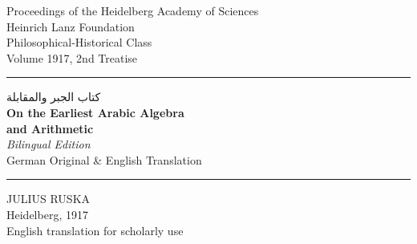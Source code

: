 \documentclass[10pt,a4paper]{article}
\newcommand{\RL}[1]{\beginR#1\endR}
\newcommand{\ar}[1]{{\arabicfont\RL{#1}}}
\begin{document}
\thispagestyle{empty}
\begin{center}
\vspace*{0.5cm}
{\footnotesize Proceedings of the Heidelberg Academy of Sciences\\
Heinrich Lanz Foundation\\
Philosophical-Historical Class\\[0.3em]
Volume 1917, 2nd Treatise}\vspace{1cm}

\rule{\textwidth}{1pt}\vspace{0.5cm}

{\ar{كتاب الجبر والمقابلة} \\[0.3em]
\textcolor{titlecolor}{\LARGE\bfseries On the Earliest Arabic Algebra\\[0.3em] and Arithmetic}\\[0.2em]
\textcolor{titlecolor}{\Large\itshape Bilingual Edition}\\[0.3em]
{\large German Original \& English Translation}}\vspace{0.5cm}

\rule{\textwidth}{1pt}\vspace{1cm}

{\Large JULIUS RUSKA}\\[0.3cm]
{\normalsize Heidelberg, 1917}\\[0.5cm]

{\small English translation for scholarly use}
\end{center}
\clearpage

\tableofcontents
\clearpage
\end{document}
